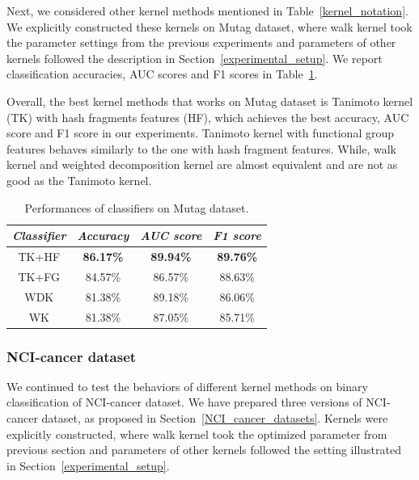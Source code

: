 \documentclass[english]{tktltiki}
\begin{document}
Next, we considered other kernel methods mentioned in Table~\ref{kernel_notation}. We explicitly constructed these kernels on Mutag dataset, where walk kernel took the parameter settings from the previous experiments and parameters of other kernels followed the description in Section~\ref{experimental_setup}. We report classification accuracies, AUC scores and F1 scores in Table~\ref{result_mutag_all}. 

Overall, the best kernel methods that works on Mutag dataset is Tanimoto kernel (TK) with hash fragments features (HF), which achieves the best accuracy, AUC score and F1 score in our experiments. Tanimoto kernel with functional group features behaves similarly to the one with hash fragment features. While, walk kernel and weighted decomposition kernel are almost equivalent and are not as good as the Tanimoto kernel.

\begin{center}
\begin{table}
\centering
\begin{tabular}{|c||c|c|c|}\hline
\textbf{\em Classifier}	&\textbf{\em Accuracy } &\textbf{\em AUC score } &\textbf{\em F1 score }\\ \hline \hline
TK+HF & \textbf{86.17\%} & \textbf{89.94\%} & \textbf{89.76\%} \\ \hline
TK+FG & 84.57\% & 86.57\% & 88.63\% \\ \hline
WDK & 81.38\% & {89.18\%} & 86.06\% \\ \hline
WK & 81.38\% & 87.05\% & 85.71\% \\ \hline
\end{tabular}
\caption[Classifier performances on Mutag dataset.]{Performances of classifiers on Mutag dataset.}
\label{result_mutag_all}
\end{table}
\end{center}



\subsubsection{NCI-cancer dataset}

We continued to test the behaviors of different kernel methods on binary classification of NCI-cancer dataset. We have prepared three versions of NCI-cancer dataset, as proposed in Section~\ref{NCI_cancer_datasets}. Kernels were explicitly constructed, where walk kernel took the optimized parameter from previous section and parameters of other kernels followed the setting illustrated in Section~\ref{experimental_setup}.
\end{document}

